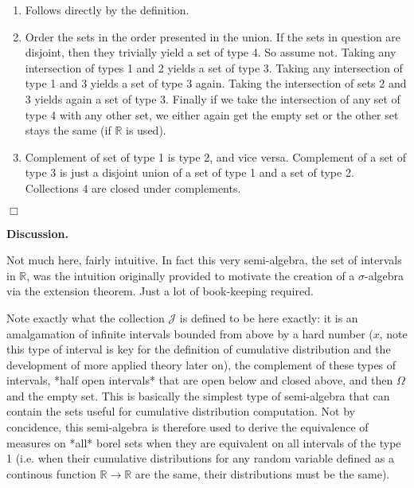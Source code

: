 \documentclass{article}
\begin{document}
\begin{enumerate}

\item Follows directly by the definition. 

\item Order the sets in the order presented in the union. If the sets in question
are disjoint, then they trivially yield a set of type 4. So assume not. Taking any intersection of
types 1 and 2 yields a set of type 3. Taking any intersection of type 1 and 3 yields a set of type 
3 again. Taking the intersection of sets 2 and 3 yields again a set of type 3. Finally if we
take the intersection of any set of type 4 with any other set, we either again get the empty set
or the other set stays the same (if $\mathbb{R}$ is used).   

\item Complement of set of type 1 is type 2, and vice versa. Complement of a set of type 3 is 
just a disjoint union of a set of type 1 and a set of type 2. Collections 4 are closed under
complements.  

\end{enumerate}

\hfill $\Box$


\bigskip

\noindent \textbf{Discussion.} 

Not much here, fairly intuitive. In fact this very semi-algebra, the set of intervals in $\mathbb{R}$, was the intuition originally provided to motivate the
creation of a $\sigma$-algebra via the extension theorem. Just a lot of book-keeping required. 

Note exactly what the collection $\mathcal{J}$ is defined to be here exactly: it is an amalgamation
of infinite intervals bounded from above by a hard number ($x$, note this type of interval
is key for the definition of cumulative distribution and the development of more applied theory
later on), the complement of these types of intervals, *half open intervals* that are open below
and closed above, and then $\Omega$ and the empty set. This is basically the simplest type
of semi-algebra that can contain the sets useful for cumulative distribution computation. Not by 
concidence, this semi-algebra is therefore used to derive the equivalence of measures on 
*all* borel sets when they are equivalent on all intervals of the type 1 (i.e. when their
cumulative distributions for any random variable defined as a continous function $\mathbb{R} \to
\mathbb{R}$ are the same, their distributions must be the same). 
\end{document}
